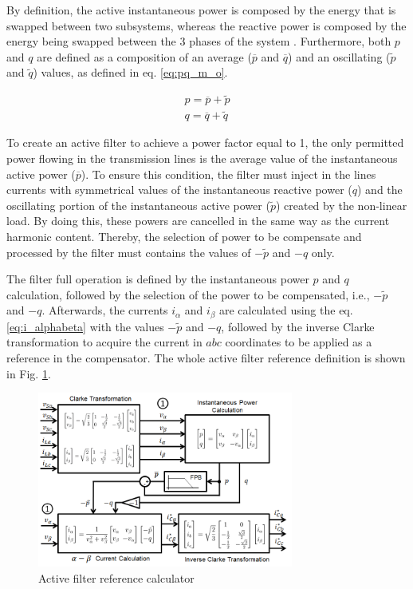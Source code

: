 By definition, the active instantaneous power is composed by the energy that is swapped between two subsystems, whereas the reactive power is composed by the energy being swapped between the 3 phases of the system \citep{Akagi1984,Peng1996}. Furthermore, both $p$ and $q$ are defined as a composition of an average ($\overline{p}$ and $\overline{q}$) and an oscillating ($\tilde{p}$ and $\tilde{q}$) values, as defined in eq. \ref{eq:pq_m_o}.

\begin{equation}
\begin{aligned}
p = \overline{p} + \tilde{p}\\
q = \overline{q} + \tilde{q} 
\end{aligned}
\label{eq:pq_m_o}
\end{equation} 

To create an active filter to achieve a power factor equal to 1, the only permitted power flowing in the transmission lines is the average value of the instantaneous active power ($\overline{p}$). To ensure this condition, the filter must inject in the lines currents with symmetrical values of the instantaneous reactive power ($q$) and the oscillating portion of the instantaneous active power ($\tilde{p}$) created by the non-linear load. By doing this, these powers are cancelled in the same way as the current harmonic content. Thereby, the selection of power to be compensate and processed by the filter must contains the values of $-\tilde{p}$ and $-q$ only.

The filter full operation is defined by the instantaneous power $p$ and $q$ calculation, followed by the selection of the power to be compensated, i.e., $-\tilde{p}$ and $-q$. Afterwards, the currents $i_{\alpha}$ and $i_{\beta}$ are calculated using the eq. \ref{eq:i_alphabeta} with the values $-\tilde{p}$ and $-q$, followed by the inverse Clarke transformation to acquire the current in $abc$ coordinates to be applied as a reference in the compensator. The whole active filter reference definition is shown in Fig. \ref{fig:diagrama_filtro.png}.

\begin{figure}[!th]
	\centering
	\includegraphics[width=0.75\textwidth]{Figures/diagrama_filtro.png}
	\caption{Active filter reference calculator}
	\label{fig:diagrama_filtro.png}
\end{figure}

